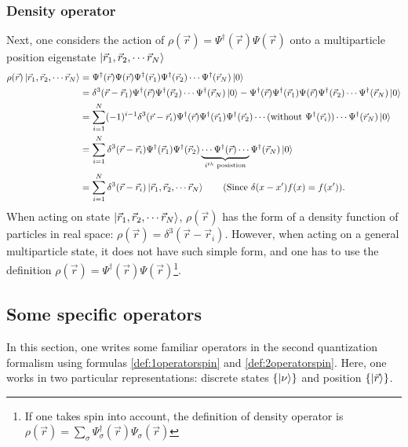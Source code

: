 \documentclass[a4paper,12pts]{article}
\numberwithin{equation}{section}
\begin{document}
	\subsubsection*{Density operator}
	Next, one considers the action of $\rho(\vec{r}) = \Psi^{\dagger}(\vec{r})\Psi(\vec{r})$ onto a multiparticle position eigenstate $\ket{\vec{r}_1,\vec{r}_2,\cdots\vec{r}_N}$
	\begin{align}
	\rho(\vec{r})\ket{\vec{r}_1,\vec{r}_2,\cdots\vec{r}_N} &= \Psi^{\dagger}(\vec{r})\Psi(\vec{r})\Psi^{\dagger}(\vec{r}_1)\Psi^{\dagger}(\vec{r}_2)\cdots\Psi^{\dagger}(\vec{r}_N)\ket{0}\\
	&= \delta^3(\vec{r}-\vec{r}_1)\Psi^{\dagger}(\vec{r})\Psi^{\dagger}(\vec{r}_2)\cdots\Psi^{\dagger}(\vec{r}_N)\ket{0} - \Psi^{\dagger}(\vec{r})\Psi^{\dagger}(\vec{r}_1)\Psi(\vec{r})\Psi^{\dagger}(\vec{r}_2)\cdots\Psi^{\dagger}(\vec{r}_N)\ket{0}\\
	&= \sum^N_{i=1} (-1)^{i-1}\delta^3(\vec{r}-\vec{r}_i)\Psi^{\dagger}(\vec{r})\Psi^{\dagger}(\vec{r}_1)\Psi^{\dagger}(\vec{r}_2)\cdots(\text{without }\Psi^{\dagger}(\vec{r}_i))\cdots\Psi^{\dagger}(\vec{r}_N)\ket{0}\\
	&= \sum^N_{i=1} \delta^3(\vec{r}-\vec{r}_i)\Psi^{\dagger}(\vec{r}_1)\Psi^{\dagger}(\vec{r}_2)\underbrace{\cdots\Psi^{\dagger}(\vec{r})\cdots}_{i^{th}\text{ posistion}}\Psi^{\dagger}(\vec{r}_N)\ket{0}\\
	&= \sum^N_{i=1} \delta^3(\vec{r}-\vec{r}_i)\ket{\vec{r}_1,\vec{r}_2,\cdots\vec{r}_N}\qquad (\text{Since } \delta(x-x')f(x)=f(x')).
	\end{align}
	When acting on state $\ket{\vec{r}_1,\vec{r}_2,\cdots\vec{r}_N}$, $\rho(\vec{r})$ has the form of a density function of particles in real space: $\rho(\vec{r}) = \delta^3(\vec{r}-\vec{r}_i)$. However, when acting on a general multiparticle state, it does not have such simple form, and one has to use the definition $\rho(\vec{r}) = \Psi^{\dagger}(\vec{r})\Psi(\vec{r})$\footnote{If one takes spin into account, the definition of density operator is $\rho(\vec{r}) = \sum_{\sigma}\Psi^{\dagger}_{\sigma}(\vec{r})\Psi_{\sigma}(\vec{r})$}.
	\subsection{Some specific operators}
	In this section, one writes some familiar operators in the second quantization formalism using formulas \ref{def:1operatorspin} and \ref{def:2operatorspin}. Here, one works in two particular representations: discrete states $\{\ket{\nu}\}$ and position $\{\ket{\vec{r}}\}$.
\end{document}
